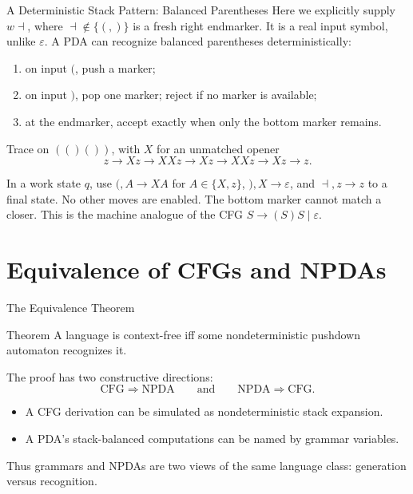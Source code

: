 \documentclass[10pt]{beamer}
\begin{document}
\begin{frame}{A Deterministic Stack Pattern: Balanced Parentheses}
  \small
  Here we explicitly supply $w\dashv$, where $\dashv\notin\{(,)\}$ is a
  fresh right endmarker. It is a real input symbol, unlike $\varepsilon$.
  A PDA can recognize balanced parentheses deterministically:
  \begin{enumerate}
    \item on input $($, push a marker;
    \item on input $)$, pop one marker; reject if no marker is available;
    \item at the endmarker, accept exactly when only the bottom marker remains.
  \end{enumerate}
  \pause
  \begin{exampleblock}{Trace on $(()())$, with $X$ for an unmatched opener}
    \[
      z\to Xz\to XXz\to Xz\to XXz\to Xz\to z.
    \]
  \end{exampleblock}
  In a work state $q$, use $(,A\to XA$ for $A\in\{X,z\}$,
  $),X\to\varepsilon$, and $\dashv,z\to z$ to a final state.
  No other moves are enabled. The bottom marker cannot match a closer.
  This is the machine analogue of the CFG $S\to(S)S\mid\varepsilon$.
\end{frame}

\section{Equivalence of CFGs and NPDAs}

\begin{frame}{The Equivalence Theorem}
  \begin{block}{Theorem}
    A language is context-free iff some nondeterministic pushdown automaton recognizes it.
  \end{block}
  The proof has two constructive directions:
  \[
    \mathrm{CFG}\Longrightarrow\mathrm{NPDA}
    \qquad\text{and}\qquad
    \mathrm{NPDA}\Longrightarrow\mathrm{CFG}.
  \]
  \pause
  \begin{itemize}
    \item A CFG derivation can be simulated as nondeterministic stack expansion.
    \item A PDA's stack-balanced computations can be named by grammar variables.
  \end{itemize}
  Thus grammars and NPDAs are two views of the same language class: generation versus recognition.
\end{frame}
\end{document}
